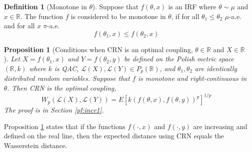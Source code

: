 \documentclass[12pt]{article}
\theoremstyle{plain}%
\newtheorem{prop}[theorem]{Proposition}
\theoremstyle{definition}
\newtheorem{definition}{Definition}[section]
\begin{document}
\begin{definition}[Monotone in $\theta$]
	Suppose that $f(\theta,x)$ is an IRF where $\theta\sim \mu$ and $x\in\mathbb{R}$. The function $f$ is considered to be monotone in $\theta$, if for all $\theta_{1}\leq \theta_{2}$ $\mu$-a.e. and for all $x$ $\pi$-a.e.
	\begin{equation}
		f(\theta_1,x)\leq f(\theta_2,x)
	\end{equation} 
\end{definition}	
\begin{prop}[Conditions when CRN is an optimal coupling, $\theta \in \mathbb{R}$ and $X\in\mathbb{R}$]\label{prop:incr1}
Let $X=f(\theta_1,x)$ and $Y=f(\theta_2,y)$ be defined on the Polish metric space $(\mathbb{R},k)$ where $k$ is QAC, $\mathcal{L}(X),\mathcal{L}(Y) \in P_p(\mathbb{R})$, and $\theta_1,\theta_2$ are identically distributed random variables. 
	Suppose that $f$ is monotone and right-continuous in $\theta$. 
	Then CRN is the optimal coupling,
	\begin{equation}
		W_p(\mathcal{L}(X), \mathcal{L}(Y)) =E[k(f(\theta,x),f(\theta,y))^p]^{1/p}
	\end{equation}
	The proof is in Section \ref{pf:incr1}.
\end{prop}
Proposition \ref{prop:incr1} states that if the functions $ f(\cdot,x)$ and $f(\cdot,y)$ are increasing and defined on the real line, then the expected distance using CRN equals the Wasserstein distance. 
\end{document}
